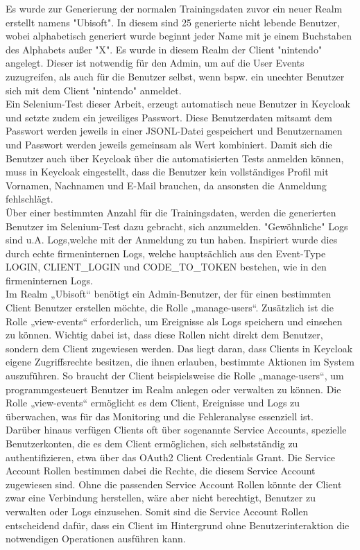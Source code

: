 \documentclass[a4paper,12pt]{article}
\begin{document}
	
	Es wurde zur Generierung der normalen Trainingsdaten zuvor ein neuer Realm erstellt namens "Ubisoft". In diesem sind 25 generierte nicht lebende Benutzer, wobei alphabetisch generiert wurde beginnt jeder Name mit je einem Buchstaben des Alphabets außer "X". Es wurde in diesem Realm der Client "nintendo" angelegt.  Dieser ist notwendig für den Admin, um auf die User Events zuzugreifen, als auch für die Benutzer selbst, wenn bspw. ein unechter Benutzer sich mit dem Client "nintendo" anmeldet.
	\\[0.5em]
	Ein Selenium-Test dieser Arbeit, erzeugt automatisch neue Benutzer in Keycloak und setzte zudem ein jeweiliges Passwort. Diese Benutzerdaten mitsamt dem Passwort werden jeweils in einer JSONL-Datei gespeichert und Benutzernamen und Passwort werden jeweils gemeinsam als Wert kombiniert. Damit sich die Benutzer auch über Keycloak über die automatisierten Tests anmelden können, muss in Keycloak eingestellt, dass die Benutzer kein vollständiges Profil mit Vornamen, Nachnamen und E-Mail brauchen, da ansonsten die Anmeldung fehlschlägt.
	\\[0.5em]
	Über einer bestimmten Anzahl für die Trainingsdaten, werden die generierten Benutzer im Selenium-Test dazu gebracht, sich anzumelden. "Gewöhnliche" Logs sind u.A. Logs,welche mit der Anmeldung zu tun haben. Inspiriert wurde dies durch echte firmeninternen Logs, welche hauptsächlich aus den Event-Type  LOGIN, CLIENT\_LOGIN und CODE\_TO\_TOKEN bestehen, wie in den firmeninternen Logs.
	\\[0.5em]
	Im Realm „Ubisoft“ benötigt ein Admin-Benutzer, der für einen bestimmten Client Benutzer erstellen möchte, die Rolle „manage-users“. Zusätzlich ist die Rolle „view-events“ erforderlich, um Ereignisse als Logs speichern und einsehen zu können. Wichtig dabei ist, dass diese Rollen nicht direkt dem Benutzer, sondern dem Client zugewiesen werden. Das liegt daran, dass Clients in Keycloak eigene Zugriffsrechte besitzen, die ihnen erlauben, bestimmte Aktionen im System auszuführen. So braucht der Client beispielsweise die Rolle „manage-users“, um programmgesteuert Benutzer im Realm anlegen oder verwalten zu können. Die Rolle „view-events“ ermöglicht es dem Client, Ereignisse und Logs zu überwachen, was für das Monitoring und die Fehleranalyse essenziell ist.
	\\[0.5em]
	Darüber hinaus verfügen Clients oft über sogenannte Service Accounts, spezielle Benutzerkonten, die es dem Client ermöglichen, sich selbstständig zu authentifizieren, etwa über das OAuth2 Client Credentials Grant. Die Service Account Rollen bestimmen dabei die Rechte, die diesem Service Account zugewiesen sind. Ohne die passenden Service Account Rollen könnte der Client zwar eine Verbindung herstellen, wäre aber nicht berechtigt, Benutzer zu verwalten oder Logs einzusehen. Somit sind die Service Account Rollen entscheidend dafür, dass ein Client im Hintergrund ohne Benutzerinteraktion die notwendigen Operationen ausführen kann.
\end{document}
